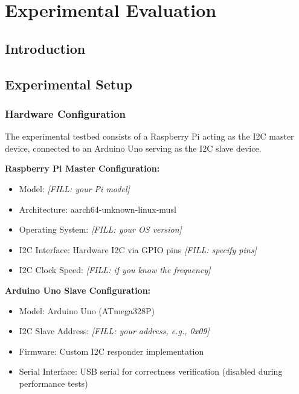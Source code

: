 \chapter{Experimental Evaluation}
\label{chap:experimental-evaluation}

\section{Introduction}
\label{sec:eval-intro}


\section{Experimental Setup}
\label{sec:experimental-setup}

\subsection{Hardware Configuration}
\label{subsec:hardware-config}

The experimental testbed consists of a Raspberry Pi acting as the I2C master device, connected to an Arduino Uno serving as the I2C slave device.

\textbf{Raspberry Pi Master Configuration:}
\begin{itemize}
    \item Model: \textit{[FILL: your Pi model]}
    \item Architecture: aarch64-unknown-linux-musl
    \item Operating System: \textit{[FILL: your OS version]}
    \item I2C Interface: Hardware I2C via GPIO pins \textit{[FILL: specify pins]}
    \item I2C Clock Speed: \textit{[FILL: if you know the frequency]}
\end{itemize}

\textbf{Arduino Uno Slave Configuration:}
\begin{itemize}
    \item Model: Arduino Uno (ATmega328P)
    \item I2C Slave Address: \textit{[FILL: your address, e.g., 0x09]}
    \item Firmware: Custom I2C responder implementation
    \item Serial Interface: USB serial for correctness verification (disabled during performance tests)
\end{itemize}

